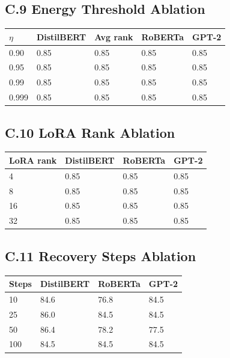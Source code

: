 \subsection{C.9 Energy Threshold Ablation}

\begin{table}[H]
\centering
\small
\begin{tabular}{lllll}
\toprule
\textbf{$\eta$} & \textbf{DistilBERT} & \textbf{Avg rank} & \textbf{RoBERTa} & \textbf{GPT-2} \\
\midrule
0.90 & 0.85 & 0.85 & 0.85 & 0.85 \\
0.95 & 0.85 & 0.85 & 0.85 & 0.85 \\
0.99 & 0.85 & 0.85 & 0.85 & 0.85 \\
0.999 & 0.85 & 0.85 & 0.85 & 0.85 \\
\bottomrule
\end{tabular}
\end{table}

\subsection{C.10 LoRA Rank Ablation}

\begin{table}[H]
\centering
\small
\begin{tabular}{llll}
\toprule
\textbf{LoRA rank} & \textbf{DistilBERT} & \textbf{RoBERTa} & \textbf{GPT-2} \\
\midrule
4 & 0.85 & 0.85 & 0.85 \\
8 & 0.85 & 0.85 & 0.85 \\
16 & 0.85 & 0.85 & 0.85 \\
32 & 0.85 & 0.85 & 0.85 \\
\bottomrule
\end{tabular}
\end{table}

\subsection{C.11 Recovery Steps Ablation}

\begin{table}[H]
\centering
\small
\begin{tabular}{llll}
\toprule
\textbf{Steps} & \textbf{DistilBERT} & \textbf{RoBERTa} & \textbf{GPT-2} \\
\midrule
10 & 84.6 & 76.8 & 84.5 \\
25 & 86.0 & 84.5 & 84.5 \\
50 & 86.4 & 78.2 & 77.5 \\
100 & 84.5 & 84.5 & 84.5 \\
\bottomrule
\end{tabular}
\end{table}

